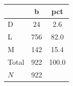 {
\def\sym#1{\ifmmode^{#1}\else\(^{#1}\)\fi}
\begin{tabular}{l*{1}{cc}}
\toprule
            &           b&         pct\\
\midrule
D           &          24&         2.6\\
L           &         756&        82.0\\
M           &         142&        15.4\\
Total       &         922&       100.0\\
\midrule
\(N\)       &         922&            \\
\bottomrule
\end{tabular}
}
